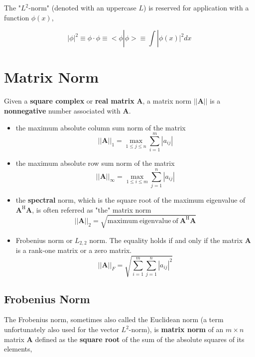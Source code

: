 The "$ L^2 $-norm" (denoted with an uppercase $ L $) is reserved for application with a function $ \phi(x) $,

\begin{equation}
|\phi|^2 \equiv \phi \cdot \phi \equiv <\phi | \phi> \equiv \int |\phi(x)|^2 dx
\end{equation}

\section{Matrix Norm}
Given a \textbf{square complex} or \textbf{real matrix} $ \mathbf{A} $, a matrix norm $ ||\mathbf{A}|| $ is a \textbf{nonnegative} number associated with $ \mathbf{A} $.

\begin{itemize}
	\item the maximum absolute column sum norm of the matrix
	\begin{equation}
	||\mathbf{A}||_1 = \max\limits_{1 \leq j \leq n} \sum_{i=1}^{m}|a_{ij}|
	\end{equation}
	\item the maximum absolute row sum norm of the matrix
	\begin{equation}
	||\mathbf{A}||_\infty = \max\limits_{1 \leq i \leq m} \sum_{j=1}^{n}|a_{ij}|
	\end{equation}
	\item the \textbf{spectral} norm, which is the square root of the maximum eigenvalue of $ \mathbf{A}^\mathrm{H}\mathbf{A} $, is often referred as "the" matrix norm
	\begin{equation}
	||\mathbf{A}||_2 = \sqrt{\mathrm{maximum~eigenvalue~of~} \mathbf{A}^\mathrm{H}\mathbf{A}}
	\end{equation}
	\item Frobenius norm or $ L_{2,2} $ norm. The equality holds if and only if the matrix $ \mathbf{A} $ is a rank-one matrix or a zero matrix.
	\begin{equation}
	||\mathbf{A}||_F = \sqrt{\sum_{i=1}^{m}\sum_{j=1}^{n}|a_{ij}|^2}
	\end{equation}
\end{itemize}

\subsection{Frobenius Norm}
The Frobenius norm, sometimes also called the Euclidean norm (a term unfortunately also used for the vector $ L^2 $-norm), is \textbf{matrix norm} of an $ m \times n $ matrix $ \mathbf{A} $ defined as the \textbf{square root} of the sum of the absolute squares of its elements,

